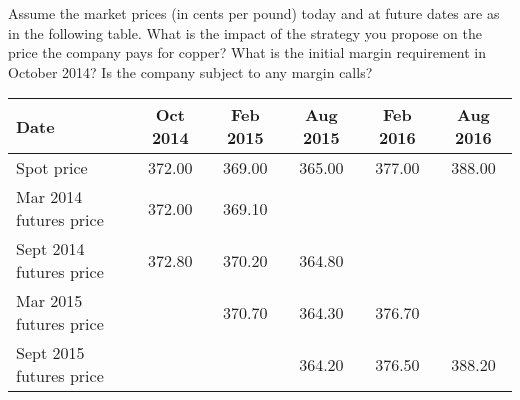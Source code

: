 \documentclass{article}
\begin{document}
\begin{itemize}
		Assume the market prices (in cents per pound) today and at future dates are as in the following table. What is the impact of the strategy you propose on the price the company pays for copper? What is the initial margin requirement in October 2014? Is the company subject to any margin calls?
		\begin{center}	
			\begin{tabular}{lccccc}
				\hline
				Date & Oct 2014 & Feb 2015 & Aug 2015 & Feb 2016 & Aug 2016 \\
				\hline
				Spot price & 372.00 & 369.00 & 365.00 & 377.00 & 388.00 \\
				Mar 2014 futures price & 372.00 & 369.10 & & & \\
				Sept 2014 futures price & 372.80 & 370.20 & 364.80 & & \\
				Mar 2015 futures price & & 370.70 & 364.30 & 376.70 & \\
				Sept 2015 futures price & & & 364.20 & 376.50 & 388.20 \\
				\hline
			\end{tabular}
		\end{center}
		
\end{itemize}
\end{document}
